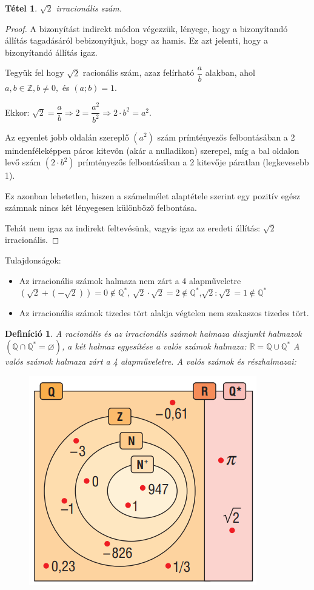 \documentclass[12pt,a4paper]{article}
\newtheorem{theorem}{Tétel} [section]
\newtheorem{definition}{Definíció} [section]
\begin{document}
\begin{theorem}
$\sqrt{2}$ irracionális szám.
\end{theorem}
\begin{proof}
A bizonyítást indirekt módon végezzük, lényege, hogy a bizonyítandó állítás tagadásáról bebizonyítjuk, hogy az hamis. Ez azt jelenti, hogy a bizonyítandó állítás igaz.

Tegyük fel hogy $\sqrt{2}$ racionális szám, azaz felírható $\dfrac{a}{b}$ alakban, ahol $a, b\in \mathbb{Z}, b \neq 0,$ és $(a; b)=1$.

Ekkor: $\sqrt{2}=\dfrac{a}{b}\Rightarrow 2= \dfrac{a^2}{b^2}\Rightarrow 2\cdot b^2=a^2$.

Az egyenlet jobb oldalán szereplő $(a^2)$ szám prímtényezős felbontásában a 2 mindenféleképpen páros kitevőn (akár a nulladikon) szerepel, míg a bal oldalon levő szám $(2 \cdot b^2)$ prímtényezős felbontásában a 2 kitevője páratlan (legkevesebb 1).

Ez azonban lehetetlen, hiszen a számelmélet alaptétele szerint egy pozitív egész számnak nincs két lényegesen különböző felbontása.

Tehát nem igaz az indirekt feltevésünk, vagyis igaz az eredeti állítás: $\sqrt{2}$ irracionális.
\end{proof}

Tulajdonságok:
\begin{itemize}
\item Az irracionális számok halmaza nem zárt a 4 alapműveletre $\left(\sqrt{2} + \left(-\sqrt{2}\right) \right)=0\notin \mathbb{Q}^*$, $\sqrt{2} \cdot \sqrt{2}=2\notin \mathbb{Q}^*$,$\sqrt{2} : \sqrt{2}=1\notin \mathbb{Q}^*$
\item Az irracionális számok tizedes tört alakja végtelen nem szakaszos tizedes tört.
\end{itemize}
\newpage
\begin{definition}
A racionális és az irracionális számok halmaza diszjunkt halmazok $(\mathbb{Q} \cap \mathbb{Q}^*=\varnothing)$, a két halmaz egyesítése a valós számok halmaza: $\mathbb{R}=\mathbb{Q} \cup \mathbb{Q}^*$
A valós számok halmaza zárt a 4 alapműveletre.
A valós számok és részhalmazai:
\begin{figure}[h]
\centering
\includegraphics[scale=0.3]{img/szam_halmazok}
\end{figure}
\end{definition}
\end{document}
